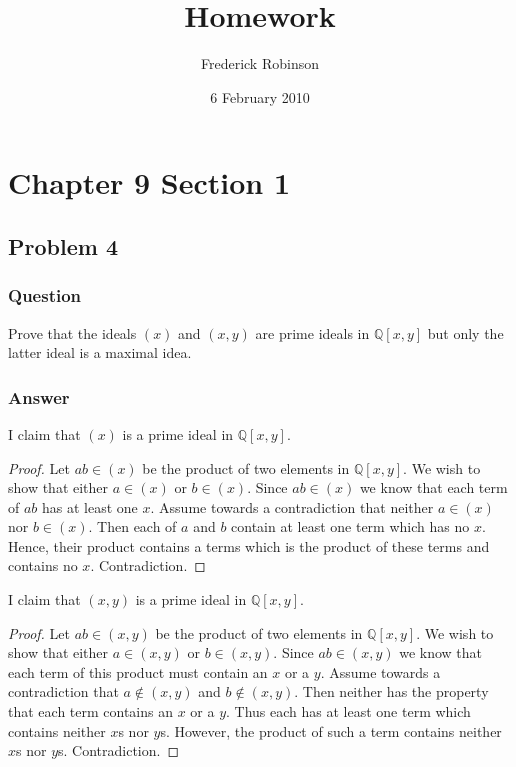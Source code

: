 \documentclass[12pt]{article}
\title{Homework}
\author{Frederick Robinson}
\date{6 February 2010}
\begin{document}

   \maketitle

\setcounter{tocdepth}{2} 

\tableofcontents

\section{Chapter 9 Section 1}
\subsection{Problem 4}

\subsubsection{Question}
Prove that the ideals $(x)$  and $(x,y)$ are prime ideals in $\mathbb{Q}[x,y]$ but only the latter ideal is a maximal idea.
\subsubsection{Answer}

I claim that $(x)$ is a prime ideal in $\mathbb{Q}[x,y]$.
\begin{proof}
Let $a b \in (x)$ be the product of two elements in $\mathbb{Q}[x,y]$. We wish to show that either $a \in (x)$ or $b \in (x)$. Since $ab \in (x)$ we know that each term of $ab$ has at least one $x$. Assume towards a contradiction that neither $a\in (x)$ nor $b\in (x)$. Then each of $a$ and $b$ contain at least one term which has no $x$. Hence, their product contains a terms which is the product of these terms and contains no $x$. Contradiction.
\end{proof}

I claim that $(x,y)$ is a prime ideal in $\mathbb{Q}[x,y]$.
\begin{proof}
Let $a b \in (x,y)$ be the product of two elements in $\mathbb{Q}[x,y]$. We wish to show that either $a \in (x,y)$ or $b \in (x,y)$. Since $a b \in (x,y)$ we know that each term of this product must contain an $x$ or a $y$. Assume towards a contradiction that $a \notin (x,y)$ and $b \notin (x,y)$. Then neither has the property that each term contains an $x$ or a $y$. Thus each has at least one term which contains neither $x$s nor $y$s. However, the product of such a term contains neither $x$s nor $y$s. Contradiction.
\end{proof}
\end{document}
